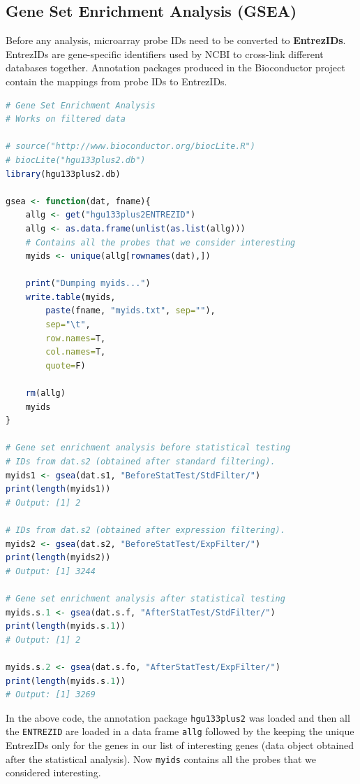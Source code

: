 \documentclass[oneside, a4paper, 11pt]{book}
\begin{document}
\subsection{Gene Set Enrichment Analysis (GSEA)}
Before any analysis, microarray probe IDs need to be converted to \textbf{EntrezIDs}. EntrezIDs are gene-specific identifiers used by NCBI to cross-link different databases together. Annotation packages produced in the Bioconductor project contain the mappings from probe IDs to EntrezIDs.

\begin{lstlisting}[language=R, caption=Gene Set Enrichment Analysis]
# Gene Set Enrichment Analysis
# Works on filtered data

# source("http://www.bioconductor.org/biocLite.R")
# biocLite("hgu133plus2.db")
library(hgu133plus2.db)

gsea <- function(dat, fname){
    allg <- get("hgu133plus2ENTREZID")
    allg <- as.data.frame(unlist(as.list(allg)))
    # Contains all the probes that we consider interesting
    myids <- unique(allg[rownames(dat),])

    print("Dumping myids...")
    write.table(myids,
        paste(fname, "myids.txt", sep=""),
        sep="\t",
        row.names=T,
        col.names=T,
        quote=F)

    rm(allg)
    myids
}

# Gene set enrichment analysis before statistical testing
# IDs from dat.s2 (obtained after standard filtering).
myids1 <- gsea(dat.s1, "BeforeStatTest/StdFilter/")
print(length(myids1))
# Output: [1] 2

# IDs from dat.s2 (obtained after expression filtering).
myids2 <- gsea(dat.s2, "BeforeStatTest/ExpFilter/")
print(length(myids2))
# Output: [1] 3244

# Gene set enrichment analysis after statistical testing
myids.s.1 <- gsea(dat.s.f, "AfterStatTest/StdFilter/")
print(length(myids.s.1))
# Output: [1] 2

myids.s.2 <- gsea(dat.s.fo, "AfterStatTest/ExpFilter/")
print(length(myids.s.1))
# Output: [1] 3269

\end{lstlisting}

In the above code, the annotation package \texttt{hgu133plus2} was loaded and then all the \texttt{ENTREZID} are loaded in a data frame \texttt{allg} followed by the keeping the unique EntrezIDs only for the genes in our list of interesting genes (data object obtained after the statistical analysis). Now \texttt{myids} contains all the probes that we considered interesting.
\end{document}
